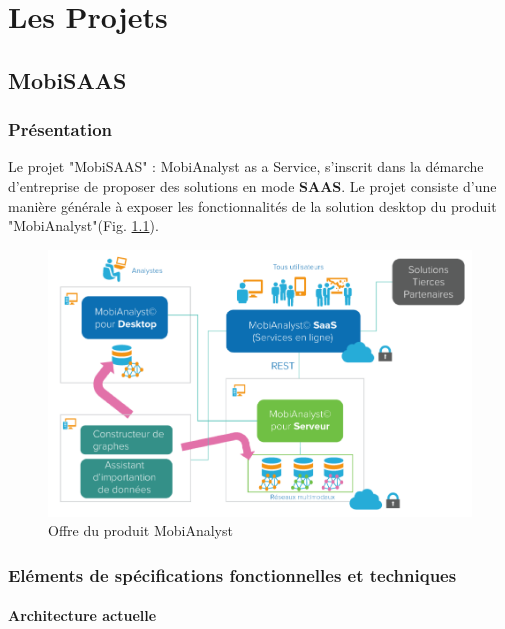 \chapter{Les Projets}
\label{Developpement}

\section{MobiSAAS}

\subsection{Présentation}

Le projet "MobiSAAS" : MobiAnalyst as a Service, s'inscrit dans la démarche d'entreprise de proposer des solutions en mode \textbf{SAAS}. Le projet consiste d'une manière générale à exposer les fonctionnalités de la solution desktop du produit "MobiAnalyst"(Fig. \ref{OffreMobiAnalyst}).\\

\begin{figure}[!h]
\centering
\includegraphics[width=14cm]{images/offre_MobiAnalyst.png}
\caption{\label{OffreMobiAnalyst}Offre du produit MobiAnalyst}
\end{figure} 

\subsection{Eléments de spécifications fonctionnelles et techniques}

\subsubsection{Architecture actuelle}

